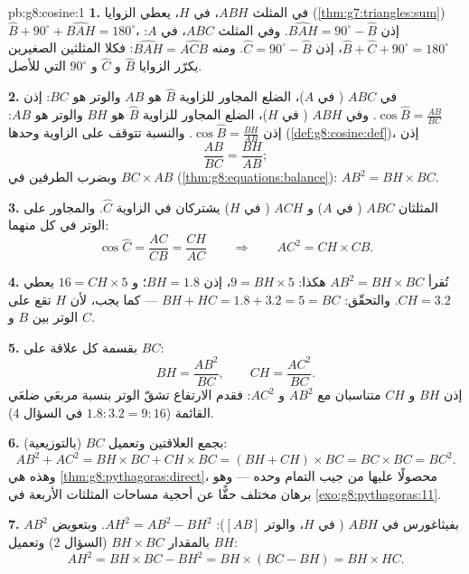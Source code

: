 \begin{solution}{pb:g8:cosine:1}
\textbf{1.} في المثلث $ABH$،  في $H$، يعطي 
الزوايا (\cref{thm:g7:triangles:sum})
$\widehat B + 90^\circ + \widehat{BAH} = 180^\circ$، إذن
$\widehat{BAH} = 90^\circ - \widehat B$. وفي المثلث $ABC$،
 في $A$:
$\widehat B + \widehat C + 90^\circ = 180^\circ$، إذن
$\widehat C = 90^\circ - \widehat B$. ومنه
$\widehat{BAH} = \widehat{ACB}$: فكلا المثلثين الصغيرين يكرّر
الزوايا $\widehat B$ و $\widehat C$ و $90^\circ$ التي للأصل.

\textbf{2.} في $ABC$ ( في $A$)، الضلع المجاور
للزاوية $\widehat B$ هو $AB$ والوتر هو $BC$:
إذن $\cos\widehat B = \frac{AB}{BC}$. وفي $ABH$ ( في $H$)،
الضلع المجاور للزاوية $\widehat B$ هو $BH$ والوتر هو
$AB$: إذن $\cos\widehat B = \frac{BH}{AB}$. والنسبة تتوقف على
الزاوية وحدها (\cref{def:g8:cosine:def})، إذن
\[
\frac{AB}{BC} = \frac{BH}{AB} ;
\]
وبضرب الطرفين في $BC \times AB$
(\cref{thm:g8:equations:balance}):
$AB^2 = BH \times BC$.

\textbf{3.} المثلثان $ABC$ ( في $A$) و $ACH$
( في $H$) يشتركان في الزاوية $\widehat C$. والمجاور
على الوتر في كل منهما:
\[
\cos\widehat C = \frac{AC}{CB} = \frac{CH}{AC}
\qquad\Longrightarrow\qquad
AC^2 = CH \times CB .
\]

\textbf{4.} تُقرأ $AB^2 = BH \times BC$ هكذا: $9 = BH \times 5$، إذن
$BH = 1.8$؛ و $16 = CH \times 5$ يعطي $CH = 3.2$. والتحقّق:
$BH + HC = 1.8 + 3.2 = 5 = BC$ --- كما يجب، لأن $H$ تقع على
الوتر بين $B$ و $C$.

\textbf{5.} بقسمة كل علاقة على $BC$:
\[
BH = \frac{AB^2}{BC},
\qquad
CH = \frac{AC^2}{BC} .
\]
إذن $BH$ و $CH$ متناسبان مع $AB^2$ و $AC^2$: فقدم
الارتفاع تشقّ الوتر بنسبة مربعَي
ضلعَي القائمة ($1.8 : 3.2 = 9 : 16$ في السؤال 4).

\textbf{6.} بجمع العلاقتين وتعميل $BC$
(بالتوزيعية):
\[
AB^2 + AC^2 = BH \times BC + CH \times BC
= (BH + CH) \times BC = BC \times BC = BC^2 .
\]
وهذه هي \cref{thm:g8:pythagoras:direct}، محصولًا عليها من جيب التمام
وحده --- وهو برهان مختلف حقًّا عن أحجية مساحات
المثلثات الأربعة في \cref{exo:g8:pythagoras:11}.

\textbf{7.} بفيثاغورس في $ABH$ ( في $H$، والوتر
$[AB]$): $AH^2 = AB^2 - BH^2$. وبتعويض $AB^2$ بالمقدار
$BH \times BC$ (السؤال 2) وتعميل $BH$:
\[
AH^2 = BH \times BC - BH^2
= BH \times (BC - BH)
= BH \times HC .
\]


\end{solution}
